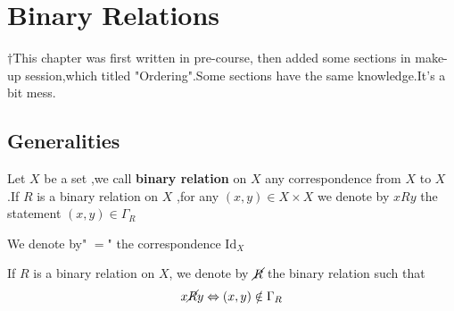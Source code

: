 \documentclass{book}
\numberwithin{equation}{section}
\begin{document}
\chapter{Binary Relations }
$\dagger$This chapter was first written in pre-course, then added some sections in make-up session,which titled "Ordering".Some sections have the same knowledge.It's a bit mess.
\section{Generalities}
\begin{definitionenv}
    Let $X$ be a set ,we call \textbf{binary relation} on $X$ any correspondence from $X$ to $X$ .If $R$ is a binary relation on $X$ ,for any $(x,y)\in X\times X $ we denote by $x R y $ the statement $(x,y)\in \Gamma_R$
\end{definitionenv}
\begin{exampleenv}
    We denote by" $=$" the correspondence $\mathrm{Id}_X$
\end{exampleenv}
\begin{definitionenv}
    If $R$ is a binary relation on $X$, we denote by $\cancel{R} $ the binary relation such that $$x \cancel{R}  y \Leftrightarrow (x,y)\notin \Gamma_R$$
\end{definitionenv}
\end{document}
